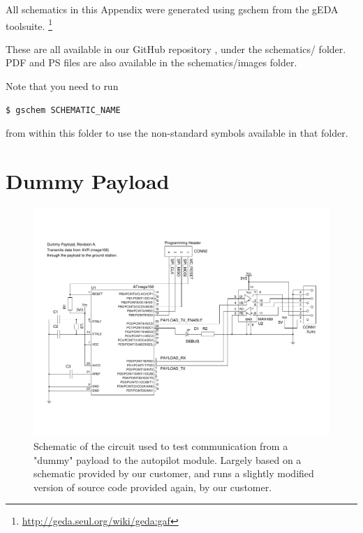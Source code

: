 
\label{appendix_schematics}

All schematics in this Appendix were generated using gschem from the gEDA 
toolsuite. \footnote{\url{http://geda.seul.org/wiki/geda:gaf}}

These are all available in our GitHub repository \cite{github}, under the 
schematics/ folder. PDF and PS files are also available in the 
schematics/images folder.

Note that you need to run 
\begin{verbatim} 
$ gschem SCHEMATIC_NAME
\end{verbatim}
from within this folder to use the non-standard symbols available in that 
folder.

\section{Dummy Payload}
\begin{figure}[H]
\includegraphics[width=1.4\textwidth, angle=90]{schematics/dummy_payload.pdf}
\caption{Schematic of the circuit used to test communication from a "dummy" 
payload to the autopilot module. Largely based on a schematic provided by 
our customer, and runs a slightly modified version of source code provided 
again, by our customer.}
\end{figure}

